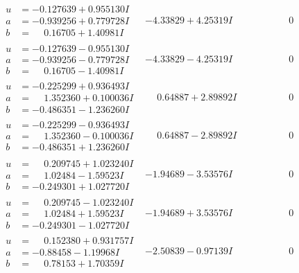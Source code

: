\documentclass[1p]{elsarticle_modified}
\theoremstyle{definition}
\begin{document}
$$\begin{array}{c|c|c}
\begin{aligned}
u &= -0.127639 + 0.955130 I \\
a &= -0.939256 + 0.779728 I \\
b &= \phantom{-}0.16705 + 1.40981 I\end{aligned}
 & -4.33829 + 4.25319 I & \phantom{-0.000000 } 0 \\ \hline\begin{aligned}
u &= -0.127639 - 0.955130 I \\
a &= -0.939256 - 0.779728 I \\
b &= \phantom{-}0.16705 - 1.40981 I\end{aligned}
 & -4.33829 - 4.25319 I & \phantom{-0.000000 } 0 \\ \hline\begin{aligned}
u &= -0.225299 + 0.936493 I \\
a &= \phantom{-}1.352360 + 0.100036 I \\
b &= -0.486351 - 1.236260 I\end{aligned}
 & \phantom{-}0.64887 + 2.89892 I & \phantom{-0.000000 } 0 \\ \hline\begin{aligned}
u &= -0.225299 - 0.936493 I \\
a &= \phantom{-}1.352360 - 0.100036 I \\
b &= -0.486351 + 1.236260 I\end{aligned}
 & \phantom{-}0.64887 - 2.89892 I & \phantom{-0.000000 } 0 \\ \hline\begin{aligned}
u &= \phantom{-}0.209745 + 1.023240 I \\
a &= \phantom{-}1.02484 - 1.59523 I \\
b &= -0.249301 + 1.027720 I\end{aligned}
 & -1.94689 - 3.53576 I & \phantom{-0.000000 } 0 \\ \hline\begin{aligned}
u &= \phantom{-}0.209745 - 1.023240 I \\
a &= \phantom{-}1.02484 + 1.59523 I \\
b &= -0.249301 - 1.027720 I\end{aligned}
 & -1.94689 + 3.53576 I & \phantom{-0.000000 } 0 \\ \hline\begin{aligned}
u &= \phantom{-}0.152380 + 0.931757 I \\
a &= -0.88458 - 1.19968 I \\
b &= \phantom{-}0.78153 + 1.70359 I\end{aligned}
 & -2.50839 - 0.97139 I & \phantom{-0.000000 } 0 \\ \hline\begin{aligned}

\end{aligned}
\end{array}$$
\end{document}
